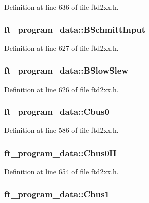 Definition at line 636 of file ftd2xx.h.\hypertarget{structft__program__data_ae66209d112e6834f94f496de77020605}{
\subsubsection[{BSchmittInput}]{ {\bf ft\_\-program\_\-data::BSchmittInput}}}
\label{structft__program__data_ae66209d112e6834f94f496de77020605}


Definition at line 627 of file ftd2xx.h.\hypertarget{structft__program__data_aed9e9f03c08c0ed471cd8387f4c64769}{
\subsubsection[{BSlowSlew}]{ {\bf ft\_\-program\_\-data::BSlowSlew}}}
\label{structft__program__data_aed9e9f03c08c0ed471cd8387f4c64769}


Definition at line 626 of file ftd2xx.h.\hypertarget{structft__program__data_a02d61a180eb84a3d1d2689f282edd71b}{
\subsubsection[{Cbus0}]{ {\bf ft\_\-program\_\-data::Cbus0}}}
\label{structft__program__data_a02d61a180eb84a3d1d2689f282edd71b}


Definition at line 586 of file ftd2xx.h.\hypertarget{structft__program__data_a8169983d1360fc06058745cb9cc7277e}{
\subsubsection[{Cbus0H}]{ {\bf ft\_\-program\_\-data::Cbus0H}}}
\label{structft__program__data_a8169983d1360fc06058745cb9cc7277e}


Definition at line 654 of file ftd2xx.h.\hypertarget{structft__program__data_a474276aec2c600f0317c0a460db1da71}{
\subsubsection[{Cbus1}]{ {\bf ft\_\-program\_\-data::Cbus1}}}
\label{structft__program__data_a474276aec2c600f0317c0a460db1da71}


